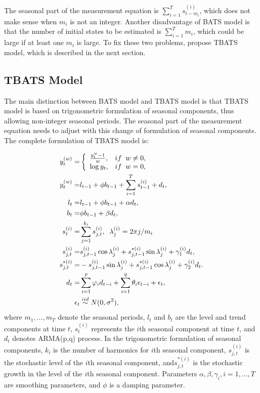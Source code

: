 \documentclass{uwstat572}
\begin{document}
The seasonal part of the measurement equation is $\sum\limits_{i=1}^T s_{t-m_i}^{(i)}$, which does not make sense when $m_i$ is not an integer. Another disadvantage of BATS model is that the number of initial states to be estimated is $\sum\limits_{i=1}^T m_i$, which could be large if at least one $m_i$ is large. To fix these two problems, \citet{de2011forecasting} propose TBATS model, which is described in the next section.  

\subsection{TBATS Model}
The main distinction between BATS model and TBATS model is that TBATS model is based on trigonometric formulation of seasonal components, thus allowing non-integer seasonal periods. The seasonal part of the measurement equation needs to adjust with this change of formulation of seasonal components. The complete formulation of TBATS model is:

\begin{subequations}
\begin{align}
y_t^{  (w)} =& \left\{
\begin{array}{l l}
\frac{y_t^{w}-1}{w}, & if \;\; w \neq 0,\\
\log y_t, & if\;\; w=0,\\
\end{array} \right. \\
y_t^{  (w)}=&l_{t-1}+\phi b_{t-1} +\sum\limits_{i=1}^T s_{t-1}^{(i)}+d_t, \\
l_t=&l_{t-1}+\phi b_{t-1}+\alpha d_t, \\
 b_t=&\phi b_{t-1}+\beta d_t, \\
s_t^{(i)}=&\sum\limits_{j=1}^{k_i} s_{j,t}^{(i)},\;\;  \lambda_{j}^{(i)}=2\pi j /m_i \\
s_{j,t}^{(i)}=&s_{j,t-1}^{(i)} \cos \lambda_j^{(i)} + s_{j,t-1}^{*(i)} \sin \lambda_j^{(i)} +\gamma_1^{(i)}d_t, \\
s_{j,t}^{*(i)}=&-s_{j,t-1}^{(i)} \sin \lambda_j^{(i)} + s_{j,t-1}^{*(i)} \cos \lambda_j^{(i)} +\gamma_2^{(i)}d_t. \\
 d_t=&\sum\limits_{i=1}^p \varphi_id_{t-i} +\sum\limits_{i=1}^q \theta_i \epsilon_{t-i}+\epsilon_t, \\
 \epsilon_t & \stackrel{iid}{\sim} N(0,\sigma^2),
\end{align}
\end{subequations}
\noindent where $m_1,..., m_T$ denote the seasonal periods, $l_t$ and $b_t$ are the level and trend components at time $t$, $s_t^{(i)}$ represents the $i$th seasonal component at time $t$, and $d_t$ denotes ARMA(p,q) process. In the trigonometric formulation of seasonal components, $k_i$ is the number of harmonics for $i$th seasonal component, $s_{j,t}^{(i)}$ is the stochastic level of the $i$th seasonal component, and$s_{j,t}^{*(i)}$ is the stochastic growth in the level of the $i$th seasonal component. Parameters $\alpha, \beta, \gamma_i, i=1,...,T$ are smoothing parameters, and $\phi$ is a damping parameter. 
\end{document}
